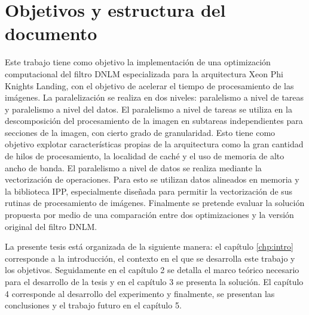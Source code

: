 \section{Objetivos y estructura del documento}


Este trabajo tiene como objetivo la implementaci\'on de una optimizaci\'on computacional del filtro DNLM especializada para la arquitectura Xeon Phi Knights Landing, con el objetivo de acelerar el tiempo de procesamiento de las im\'agenes. La paralelizaci\'on se realiza en dos niveles: paralelismo a nivel de tareas y paralelismo a nivel del datos. El paralelismo a nivel de tareas se utiliza en la descomposici\'on del procesamiento de la imagen en subtareas independientes para secciones de la imagen, con cierto grado de granularidad. Esto tiene como objetivo explotar caracter\'isticas propias de la arquitectura como la gran cantidad de hilos de procesamiento, la localidad de cach\'e y el uso de memoria de alto ancho de banda. El paralelismo a nivel de datos se realiza mediante la vectorizaci\'on de operaciones. Para esto se utilizan datos alineados en memoria y la biblioteca IPP, especialmente dise\~nada para permitir la vectorizaci\'on de sus rutinas de procesamiento de im\'agenes. Finalmente se pretende evaluar la soluci\'on propuesta por medio de una comparaci\'on entre dos optimizaciones y la versi\'on original del filtro DNLM.


La presente tesis est\'a organizada de la siguiente manera: el cap\'itulo \ref{chp:intro} corresponde a la introducci\'on, el contexto en el que se desarrolla este trabajo y los objetivos. Seguidamente en el cap\'itulo 2 se detalla el marco te\'orico necesario para el desarrollo de la tesis y en el cap\'itulo 3 se presenta la soluci\'on. El cap\'itulo 4 corresponde al desarrollo del experimento y finalmente, se presentan las conclusiones y el trabajo futuro en el cap\'itulo 5. 


%

